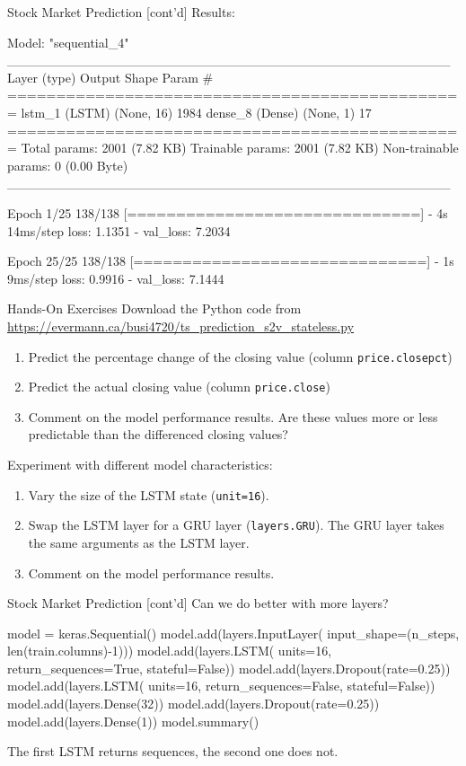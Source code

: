 \documentclass[ignorenonframetext,xcolor=x11names]{beamer}
\begin{document}
\begin{frame}[fragile]{Stock Market Prediction \small [cont'd]}
Results:
\begin{textcode}
Model: "sequential_4"
_______________________________________________
 Layer (type)       Output Shape     Param #   
===============================================
 lstm_1 (LSTM)      (None, 16)       1984      
 dense_8 (Dense)    (None, 1)        17        
===============================================
Total params: 2001 (7.82 KB)
Trainable params: 2001 (7.82 KB)
Non-trainable params: 0 (0.00 Byte)
_______________________________________________

Epoch 1/25
138/138 [==============================] - 4s 14ms/step 
loss: 1.1351 - val_loss: 7.2034

Epoch 25/25
138/138 [==============================] - 1s 9ms/step
loss: 0.9916 - val_loss: 7.1444
\end{textcode}
\end{frame}


\begin{frame}{Hands-On Exercises}
\small
Download the Python code from \url{https://evermann.ca/busi4720/ts_prediction_s2v_stateless.py}

\begin{enumerate}
   \item Predict the percentage change of the closing value (column \texttt{price.closepct})
   \item Predict the actual closing value (column \texttt{price.close})
   \item Comment on the model performance results. Are these values more or less predictable than the differenced closing values?
\end{enumerate}

Experiment with different model characteristics:
\begin{enumerate}
    \item Vary the size of the LSTM state (\texttt{unit=16}).
    \item Swap the LSTM layer for a GRU layer (\texttt{layers.GRU}). The GRU layer takes the same arguments as the LSTM layer.
    \item Comment on the model performance results.
\end{enumerate}
\end{frame}

\begin{frame}[fragile]{Stock Market Prediction \small [cont'd]}
Can we do better with more layers?
\begin{pythoncode}
model = keras.Sequential()
model.add(layers.InputLayer(
    input_shape=(n_steps, len(train.columns)-1)))
model.add(layers.LSTM(
    units=16,
    return_sequences=True,
    stateful=False))
model.add(layers.Dropout(rate=0.25))
model.add(layers.LSTM(
    units=16,
    return_sequences=False,
    stateful=False))
model.add(layers.Dense(32))
model.add(layers.Dropout(rate=0.25))
model.add(layers.Dense(1))
model.summary()
\end{pythoncode}
The first LSTM returns sequences, the second one does not.
\end{frame}
\end{document}

